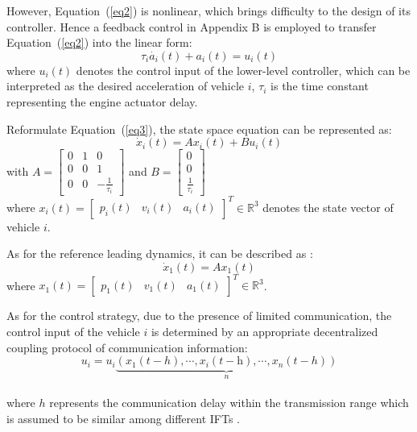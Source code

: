 \documentclass[a4paper]{cas-sc}
\begin{document}
However, Equation~(\ref{eq2}) is nonlinear, which brings difficulty to the design of its controller. Hence a feedback control in Appendix B is employed to transfer Equation~(\ref{eq2}) into the linear form:
\begin{equation}
  \tau_i\dot{a_i}\left(t\right)+a_i\left(t\right)=u_i(t)
  \label{eq3}
\end{equation}
where $u_i(t)$ denotes the control input of the lower-level controller, which can be interpreted as the desired acceleration of vehicle $i$, $\tau_i$ is the time constant representing the engine actuator delay.

Reformulate Equation~(\ref{eq3}), the state space equation can be represented as:
\begin{equation}
  {\dot x_i}\left( t \right) = A{x_i}\left( t \right) + B{u_i}\left( t \right)
  \label{eq4}
\end{equation}
with $A = \left[ {\begin{array}{*{20}{c}}
          0 & 1 & 0                          \\
          0 & 0 & 1                          \\
          0 & 0 & { - \frac{1}{{{\tau _i}}}}
        \end{array}} \right]$ and $B = \left[ {\begin{array}{*{20}{c}}
          0 \\
          0 \\
          {\frac{1}{{{\tau _i}}}}
        \end{array}} \right]$\\
where ${x_i}\left( t \right) = {\left[ {\begin{array}{*{20}{c}}
          {{p_i}\left( t \right)} & {{v_i}\left( t \right)} & {{a_i}\left( t \right)}
        \end{array}} \right]^T} \in {\mathbb{R}^3}$ denotes the state vector of vehicle $i$.

As for the reference leading dynamics, it can be described as \citep{Hengster-Movric2015}:
\begin{equation}
  {\dot x_1}\left( t \right) = A{x_1}\left( t \right)
  \label{eq6}
\end{equation}
where ${x_1}\left( t \right) = {\left[ {\begin{array}{*{20}{c}}
          {{p_1}\left( t \right)} & {{v_1}\left( t \right)} & {{a_1}\left( t \right)}
        \end{array}} \right]^T} \in {\mathbb{R}^3}$.

As for the control strategy, due to the presence of limited communication, the control input of the vehicle $i$ is determined by an appropriate decentralized coupling protocol of communication information:
\begin{equation}
  {u_i} = {u_i}\underbrace {\left( {{x_1}\left( {t - h} \right), \cdots ,{x_i}\left( {t - {\text{h}}} \right), \cdots ,{x_n}\left( {t - h} \right)} \right)}_n
  \label{eq7}
\end{equation}\\
where $h$ represents the communication delay within the transmission range which is assumed to be similar among different IFTs \citep{Zheng2015,Vukadinovic2018,Vu2020,Martin-Sacristan2020,Pirani2022}.
\end{document}
